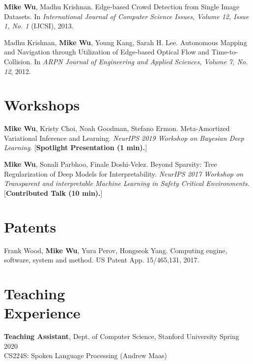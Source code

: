 \documentclass[margin, 10pt]{res} %
\begin{document}
\begin{resume}
\textbf{Mike Wu}, Madhu Krishnan. Edge-based Crowd Detection from Single Image Datasets. In \textit{International Journal of Computer Science Issues, Volume 12, Issue 1, No. 1} (IJCSI), 2013.

Madhu Krishnan, \textbf{Mike Wu}, Young Kang, Sarah H. Lee. Autonomous Mapping and Navigation through Utilization of Edge-based Optical Flow and Time-to-Collision. In \textit{ARPN Journal of Engineering and Applied Sciences, Volume 7, No. 12}, 2012.

\section{Workshops}

\textbf{Mike Wu}, Kristy Choi, Noah Goodman, Stefano Ermon. Meta-Amortized Variational Inference and Learning. \textit{NeurIPS 2019 Workshop on Bayesian Deep Learning}. [\textbf{Spotlight Presentation (1 min).}]

\textbf{Mike Wu}, Sonali Parbhoo, Finale Doshi-Velez. Beyond Sparsity: Tree Regularization of Deep Models for Interpretability. \textit{NeurIPS 2017 Workshop on Transparent and interpretable Machine Learning in Safety Critical Environments}. [\textbf{Contributed Talk (10 min).}]


\section{Patents}

Frank Wood, \textbf{Mike Wu}, Yura Perov, Hongseok Yang. Computing engine, software, system and method. US Patent App. 15/465,131, 2017.


\section{Teaching \\ Experience}

\textbf{Teaching Assistant}, Dept. of Computer Science, Stanford University \hfill Spring 2020\\
CS224S: Spoken Language Processing (Andrew Maas)


\end{resume}
\end{document}
